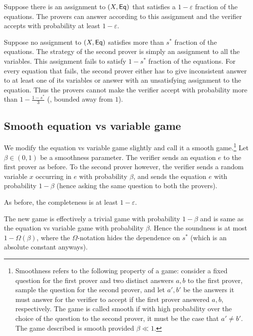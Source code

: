 \documentclass{toc}
\newcommand\eps{\varepsilon}
\begin{document}
\smallskip
{} Suppose there is an assignment to $(X, {\sf Eq})$ that satisfies
a %
$1-\eps$ fraction of the equations.
The provers can answer according to this assignment and the verifier accepts with probability at least $1-\eps$.

\smallskip
{} Suppose no assignment to  $(X, {\sf Eq})$
satisfies more than $s^*$ fraction of the equations. The strategy of the second prover is simply an assignment to all the variables.
This assignment fails to satisfy $1-s^*$ fraction of the equations. For every equation that fails, the second prover either has to
give inconsistent answer to at least one of its variables or answer with an unsatisfying assignment to the equation. Thus the provers
cannot make the verifier accept with probability more than $1 - \frac{1-s^*}{3}$ (\ie, bounded away from $1$).



\subsection{Smooth equation vs variable game}

We modify the equation vs variable game slightly and call it a smooth game.\footnote{Smoothness refers to the following
property of a game: consider a fixed question for the first prover and two distinct answers $a,b$ to the first prover,
sample the question for the second prover, and let $a',b'$ be the answers it must answer for the verifier to accept if
the first prover answered $a,b$, respectively.  %
The game is called smooth if with high probability over the choice of the
question to the second prover, it must be the case that $a'\neq b'$. The game described is smooth provided $\beta \ll 1$. }
 Let $\beta \in (0,1)$ be a smoothness parameter.
The verifier sends an equation $e$ to the first prover as before. To the second prover however,
the verifier sends a random variable $x$ occurring in $e$ with probability $\beta$, and sends the equation $e$
with probability $1-\beta$ (hence asking the same question to both the provers).

\smallskip
{} As before, the completeness is at least $1-\eps$.

\smallskip
{} The new game is effectively a trivial game with probability $1- \beta$ and is same
as the equation vs variable game  with probability $\beta$. Hence the soundness is at most $1- \Omega\left(\beta\right)$,
where the $\Omega$-notation hides the dependence on $s^*$ (which is an absolute constant anyways).
\end{document}
